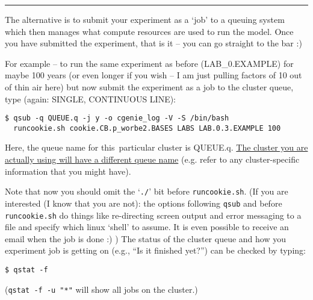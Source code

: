\vspace{1mm}\noindent\rule{4cm}{0.1mm}\vspace{2mm}

\noindent The alternative is to submit your experiment as a ‘job’ to a queuing system which then manages what compute resources are used to run the model. Once you have submitted the experiment, that is it – you can go straight to the bar :)

For example -- to run the same experiment as before (\textsf{\footnotesize LAB\_0.EXAMPLE}) for maybe 100 years (or even longer if you wish – I am just pulling factors of 10 out of thin air here) but now submit the experiment as a job to the cluster queue, type (again: SINGLE, CONTINUOUS LINE):
\vspace{-1mm}
\small\begin{verbatim}
$ qsub -q QUEUE.q -j y -o cgenie_log -V -S /bin/bash 
  runcookie.sh cookie.CB.p_worbe2.BASES LABS LAB.0.3.EXAMPLE 100
\end{verbatim}\normalsize
\vspace{-1mm}

Here, the queue name for this\ particular cluster is \textsf{\footnotesize QUEUE.q}. \uline{The cluster you are actually using will have a different queue name} (e.g. refer to any cluster-specific information that you might have).

\vspace{1mm}
Note that now you should omit the ‘\texttt{./}’ bit before \texttt{runcookie.sh}.
(If you are interested (I know that you are not): the options following \texttt{qsub} and before \texttt{runcookie.sh} do things like re-directing screen output and error messaging to a file and specify which linux ‘shell’ to assume. It is even possible to receive an email when the job is done :) )
The status of the cluster queue and how you experiment job is getting on (e.g., “Is it finished yet?”) can be checked by typing:
\vspace{-1mm}
\small\begin{verbatim}
$ qstat -f
\end{verbatim}\normalsize
\vspace{-1mm}
(\texttt{qstat -f -u "*"} will show all jobs on the cluster.)

